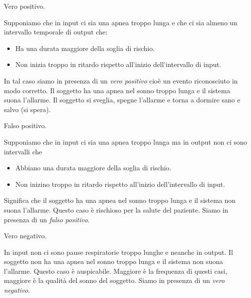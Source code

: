 

 



\begin{bf}Vero positivo.\end{bf}
  Supponiamo che in input ci sia una apnea troppo lunga e che ci sia almeno un intervallo temporale di output che:
  \begin{itemize}
    \item 
      Ha una durata maggiore della soglia di rischio. 
    \item
      Non inizia troppo in ritardo rispetto all'inizio dell'intervallo di input.
  \end{itemize}
  In tal caso siamo in presenza di un \emph{vero positivo} cio\`e un evento riconosciuto in modo corretto.
  Il soggetto ha una apnea nel sonno troppo lunga e il sistema suona l'allarme. Il soggetto si sveglia, spegne l'allarme e torna a dormire sano e salvo (si spera).

\begin{bf}Falso positivo.\end{bf}
  Supponiamo che in input ci sia una apnea troppo lunga ma in output non ci sono intervalli che
  \begin{itemize}
    \item 
      Abbiano una durata maggiore della soglia di rischio. 
    \item
      Non inizino troppo in ritardo rispetto all'inizio dell'intervallo di input.
  \end{itemize}
  Significa che il soggetto ha una apnea nel sonno troppo lunga e il sistema non suona l'allarme. 
  Questo caso \`e rischioso per la salute del paziente.
  Siamo in presenza di un \emph{falso positivo}.



\begin{bf}Vero negativo.\end{bf}
  In input non ci sono pause respiratorie troppo lunghe e neanche in output.
  Il soggetto non ha una apnea nel sonno troppo lunga e il sistema non suona l'allarme. 
  Questo caso \`e auspicabile. 
  Maggiore \`e la frequenza di questi casi, maggiore \`e la qualit\`a del sonno del soggetto.
  Siamo in presenza di un \emph{vero negativo}.



